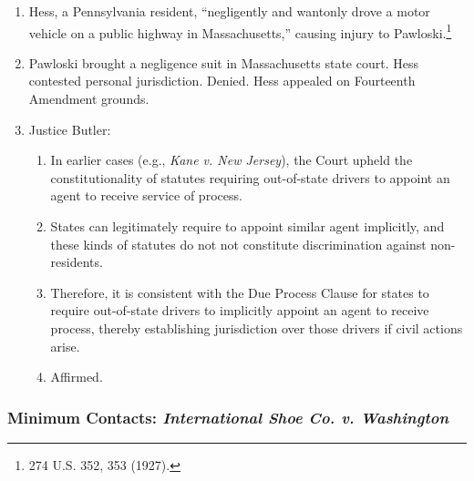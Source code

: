 \begin{enumerate}
    \item Hess, a Pennsylvania resident, ``negligently and wantonly drove a 
    motor vehicle on a public highway in Massachusetts,'' causing injury to 
    Pawloski.\footnote{274 U.S. 352, 353 (1927).}
    \item Pawloski brought a negligence suit in Massachusetts state court.  
    Hess contested personal jurisdiction. Denied. Hess appealed on Fourteenth 
    Amendment grounds.
    \item Justice Butler:
    \begin{enumerate}
        \item In earlier cases (e.g., \emph{Kane v. New Jersey}), the Court 
        upheld the constitutionality of statutes requiring out-of-state 
        drivers to appoint an agent to receive service of process.
        \item States can legitimately require to appoint similar agent 
        implicitly, and these kinds of statutes do not not constitute 
        discrimination against non-residents.
        \item Therefore, it is consistent with the Due Process Clause for 
        states to require out-of-state drivers to implicitly appoint an agent 
        to receive process, thereby establishing jurisdiction over those 
        drivers if civil actions arise.
        \item Affirmed.
    \end{enumerate}
\end{enumerate}

\subsubsection{Minimum Contacts: \emph{International Shoe Co. v. Washington}}


